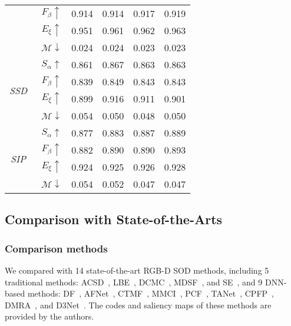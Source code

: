 \documentclass[journal]{IEEEtran}
\newcommand{\ACSD}{ACSD~\cite{ju2014depth}}
\newcommand{\SSD}{\textit{SSD}~\cite{zhu2017three}}
\newcommand{\SIP}{\textit{SIP}~\cite{fan2019D3Net}}
\begin{document}
\begin{table}[t]
\begin{tabular}{cc|cccc}
		& $F_{\beta}\uparrow$     & 0.914 & 0.914 & 0.917 & 0.919  \\
		& $E_{\xi}\uparrow$       & 0.951 & 0.961 & 0.962 & 0.963  \\
		& $\mathcal{M}\downarrow$ & 0.024 & 0.024 & 0.023 & 0.023  \\
		\hline
		\multirow{4}{*}{\begin{sideways}\SSD\end{sideways}}
		& $S_{\alpha}\uparrow$    & 0.861 & 0.867 & 0.863 & 0.863  \\
		& $F_{\beta}\uparrow$     & 0.839 & 0.849 & 0.843 & 0.843  \\
		& $E_{\xi}\uparrow$       & 0.899 & 0.916 & 0.911 & 0.901  \\
		& $\mathcal{M}\downarrow$ & 0.054 & 0.050 & 0.048 & 0.050  \\
		\hline
		\multirow{4}{*}{\begin{sideways}\SIP\end{sideways}}
		& $S_{\alpha}\uparrow$    & 0.877 & 0.883 & 0.887 & 0.889  \\
		& $F_{\beta}\uparrow$     & 0.882 & 0.890 & 0.890 & 0.893  \\
		& $E_{\xi}\uparrow$       & 0.924 & 0.925 & 0.926 & 0.928  \\
		& $\mathcal{M}\downarrow$ & 0.054 & 0.052 & 0.047 & 0.047  \\
		\bottomrule
		\hline
	\end{tabular}
	\label{tab:backbone}
\end{table}

\subsection{Comparison with State-of-the-Arts}
\label{sec:SOTA}
\subsubsection{Comparison methods}
We compared with 14 state-of-the-art RGB-D SOD methods, including 5 traditional methods: \ACSD, LBE~\cite{feng2016local}, DCMC~\cite{cong2016saliency}, MDSF~\cite{song2017depth}, and SE~\cite{guo2016salient},
and 9 DNN-based methods: DF~\cite{qu2017rgbd}, AFNet~\cite{wang2019adaptive}, CTMF~\cite{han2017cnns}, MMCI~\cite{chen2019multi}, PCF~\cite{chen2018progressively}, TANet~\cite{chen2019three}, CPFP~\cite{zhao2019Contrast},  DMRA~\cite{piao2019depth}, and D3Net~\cite{fan2019D3Net}.
The codes and saliency maps of these methods are provided by the authors.
\end{document}

